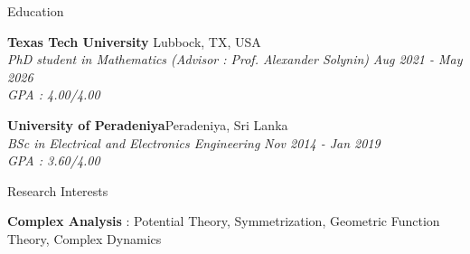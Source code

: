 \documentclass{resume} %
\begin{document}

\medskip 

\begin{rSection}{Education}

{\bf Texas Tech University}\hfill{ Lubbock, TX, USA}
\\ \textit{PhD student in Mathematics (Advisor : Prof. Alexander Solynin)} \hfill{\em \scriptsize{Aug 2021 - May 2026} }
\\ \textit{GPA : 4.00/4.00}

{\bf University of Peradeniya}\hfill{Peradeniya, Sri Lanka}
\\ \textit{BSc in Electrical and Electronics Engineering} \hfill{\em \scriptsize{Nov 2014 - Jan 2019} }
\\ \textit{GPA : 3.60/4.00}



\end{rSection}


\begin{rSection}{Research Interests}

{\bf  Complex Analysis} : Potential Theory, Symmetrization, Geometric Function Theory, Complex Dynamics
\end{rSection}
\end{document}
